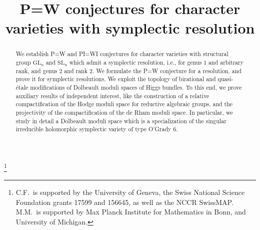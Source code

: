 \documentclass[JEP,XML,SOM,Unicode, NoEqCountersInSection,NoFloatCountersInSection,published]{cedram}
\theoremstyle{definition}
\begin{document}
\frontmatter
\title{P=W conjectures for character varieties with symplectic resolution}

\author[\initial{C.} \lastname{Felisetti}]{ }
\address{University of Trento, Department of mathematics\\
Via Sommarive 14, 38123 Povo (TN), Italy}

\author[\initial{M.} \lastname{Mauri}]{ }
\address{University of Michigan\\
East Hall, 530 Church St, Ann Arbor 48109, Michigan, USA}

\thanks{C.F.\ is supported by the University of Geneva, the Swiss National Science Foundation grants 17599 and 156645, as well as the NCCR SwissMAP. M.M.\ is supported by Max Planck Institute for Mathematics in Bonn, and University of Michigan.}

\begin{abstract}
We establish P=W and PI=WI conjectures for character varieties with structural group $\mathrm{GL}_n$ and $\mathrm{SL}_n$ which admit a symplectic resolution, i.e., for genus $1$ and arbitrary rank, and genus $2$ and rank $2$. We formulate the P=W conjecture for a resolution, and prove it for symplectic resolutions. We exploit the topology of birational and quasi-étale modifications of Dolbeault moduli spaces of Higgs bundles. To this end, we prove auxiliary results of independent interest, like the construction of a relative compactification of the Hodge moduli space for reductive algebraic groups, and the projectivity of the compactification of the de Rham moduli space. In particular, we study in detail a Dolbeault moduli space which is a specialization of the singular irreducible holomorphic symplectic variety of type O'Grady $6$.
\end{abstract}




\end{document}
